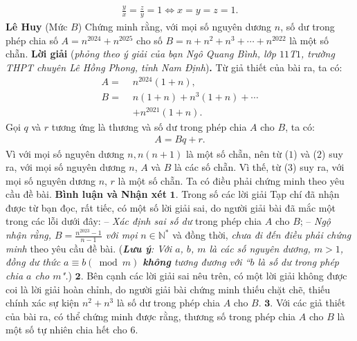 \begin{multicols}{2}
\begin{align*}
		\frac{y}{x} = \frac{z}{y} = 1 \Leftrightarrow  x = y = z = 1.
	\end{align*}
	\hfill	\textbf{\color{thachthuctoanhoc}Lê Huy}
	\vskip 0.1cm
	{}
	(Mức $B$) Chứng minh rằng, với mọi số nguyên dương $n$, số dư trong phép chia số $A=n^{2024}+n^{2025}$  cho số $B=n+n^2+n^3+\cdots+n^{2022}$ là một số chẵn. 
	\vskip 0.05cm
	\textbf{\color{thachthuctoanhoc}Lời giải} (\textit{phỏng theo ý giải của bạn Ngô Quang Bình, lớp $11$T$1$, trường THPT chuyên Lê Hồng Phong, tỉnh Nam Định})\textbf{\color{thachthuctoanhoc}.}
	\vskip 0.05cm
	Từ giả thiết của bài ra, ta có:
	\begin{align*}
		A = \,\,&{n^{2024}}\left( {1 + n} \right), \tag{$1$}\\
		B = \,\,&n\left( {1 + n} \right) + {n^3}\left( {1 + n} \right) +  \cdots  \\
		&+ {n^{2021}}\left( {1 + n} \right). \tag{$2$}
	\end{align*}
	Gọi $q$ và $r$ tương ứng là thương và số dư trong phép chia $A$ cho $B$, ta có:
	\begin{align*}
		A = Bq + r. \tag{$3$}
	\end{align*}
	Vì với mọi số nguyên dương $n, n(n + 1)$ là một số chẵn, nên từ ($1$) và ($2$) suy ra, với mọi số nguyên dương $n$, $A$ và $B$ là các số chẵn. Vì thế, từ ($3$) suy ra, với mọi số nguyên dương $n$, $r$ là một số chẵn.
	\vskip 0.05cm
	Ta có điều phải chứng minh theo yêu cầu đề bài.
	\vskip 0.05cm
	\textbf{\color{thachthuctoanhoc}Bình luận và Nhận xét}
	\vskip 0.05cm
	$\pmb{1.}$ Trong số các lời giải Tạp chí đã nhận được từ bạn đọc, rất tiếc, có một số lời giải sai, do người giải bài đã mắc một trong các lỗi dưới đây:
	\vskip 0.05cm
	-- \textit{Xác định sai số dư} trong phép chia $A$ cho $B$;
	\vskip 0.05cm
	--\textit{ Ngộ nhận rằng, $B = \frac{{{n^{2023}} - 1}}{{n - 1}}$  với mọi} $n \in \mathbb{N^*}$  và đồng thời, \textit{chưa đi đến điều phải chứng minh} theo yêu cầu đề bài.
	\vskip 0.05cm
	(\textit{\textbf{\color{thachthuctoanhoc}Lưu ý}: Với $a$, $b$, $m$ là các số nguyên dương, $m > 1$, đồng dư thức $a \equiv b\left( {\bmod m} \right)$  \textbf{\color{thachthuctoanhoc}không} tương đương với ``$b$ là số dư trong phép chia $a$ cho $m$".})
	\vskip 0.05cm
	$\pmb{2.}$ Bên cạnh các lời giải sai nêu trên, có một lời giải không được coi là lời giải hoàn chỉnh, do người giải bài chứng minh thiếu chặt chẽ, thiếu chính xác sự kiện $n^2 + n^3$  là số dư trong phép chia $A$ cho $B$.
	\vskip 0.05cm
	$\pmb{3.}$ Với các giả thiết của bài ra, có thể chứng minh được rằng, thương số trong phép chia $A$ cho $B$ là một số tự nhiên chia hết cho $6$.

\end{multicols}
